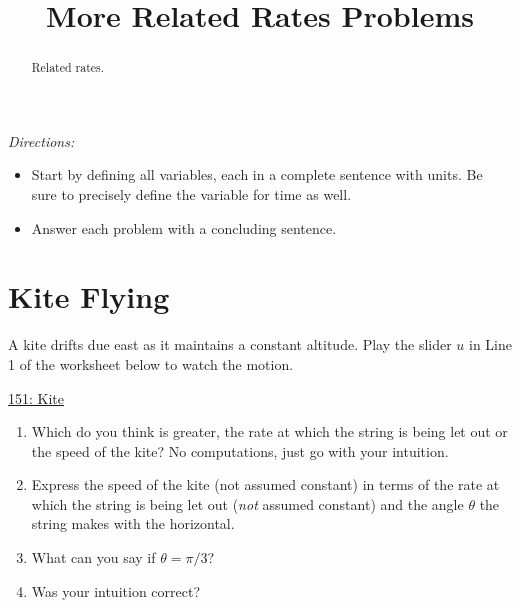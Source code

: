 \documentclass{ximera}
\title{More Related Rates Problems}
\begin{document}
\begin{abstract}
Related rates.
\end{abstract}
\maketitle


\emph{Directions:}
\begin{itemize}
\item Start by defining all variables, each in a complete sentence with units. Be sure to precisely define the variable for time as well.

\item Answer each problem with a concluding sentence.
\end{itemize}


\section{Kite Flying}
\begin{question} \label{Q9oigohonn}
A kite drifts due east as it maintains a constant altitude. Play the slider $u$ in Line 1 of the worksheet below to watch the motion.

 
\begin{onlineOnly}
   \begin{center}
\end{center}
\end{onlineOnly}

\href{https://www.desmos.com/calculator/qdrzdt4erc}{151: Kite}

\begin{enumerate}
\item Which do you think is greater, the rate at which the string is being let out or the speed of the kite? No computations, just go with your intuition.

\item Express the speed of the kite (not assumed constant) in terms of the rate at which the string is being let out (\emph{not} assumed constant) and the angle $\theta$ the string makes with the horizontal.

\item What can you say if $\theta =  \pi/3$?

\item Was your intuition correct?
\end{enumerate}
\end{question}
\end{document}

